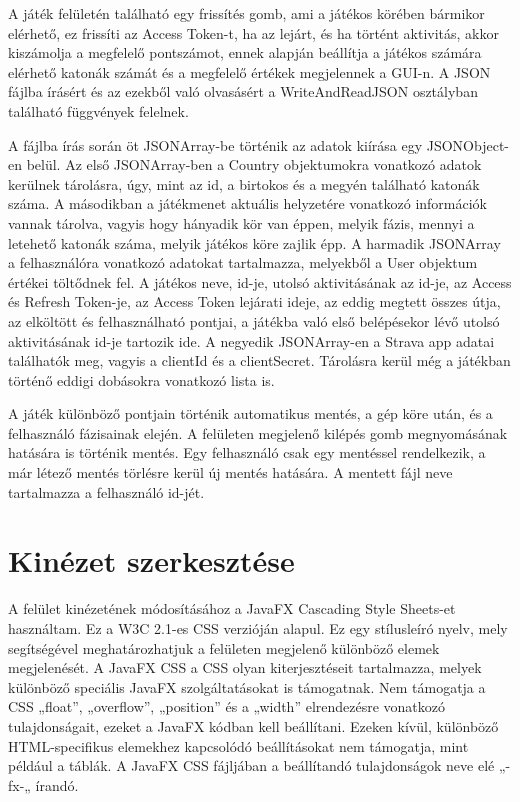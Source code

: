 A játék felületén található egy frissítés gomb, ami a játékos körében bármikor elérhető, ez frissíti az Access Token-t, ha az lejárt, és ha történt aktivitás, akkor kiszámolja a megfelelő pontszámot, ennek alapján beállítja a játékos számára elérhető katonák számát és a megfelelő értékek megjelennek a GUI-n. A JSON fájlba írásért és az ezekből való olvasásért a WriteAndReadJSON osztályban található függvények felelnek. 

A fájlba írás során öt JSONArray-be történik az adatok kiírása egy JSONObject-en belül. Az első JSONArray-ben a Country objektumokra vonatkozó adatok kerülnek tárolásra, úgy, mint az id, a birtokos és a megyén található katonák száma. A másodikban a játékmenet aktuális helyzetére vonatkozó információk vannak tárolva, vagyis hogy hányadik kör van éppen, melyik fázis, mennyi a letehető katonák száma, melyik játékos köre zajlik épp. A harmadik JSONArray a felhasználóra vonatkozó adatokat tartalmazza, melyekből a User objektum értékei töltődnek fel. A játékos neve, id-je, utolsó aktivitásának az id-je, az Access és Refresh Token-je, az Access Token lejárati ideje, az eddig megtett összes útja, az elköltött és felhasználható pontjai, a játékba való első belépésekor lévő utolsó aktivitásának id-je tartozik ide. A negyedik JSONArray-en a Strava app adatai találhatók meg, vagyis a clientId és a clientSecret. Tárolásra kerül még a játékban történő eddigi dobásokra vonatkozó lista is. 

A játék különböző pontjain történik automatikus mentés, a gép köre után, és a felhasználó fázisainak elején. A felületen megjelenő kilépés gomb megnyomásának hatására is történik mentés. Egy felhasználó csak egy mentéssel rendelkezik, a már létező mentés törlésre kerül új mentés hatására. A mentett fájl neve tartalmazza a felhasználó id-jét. 

\section{Kinézet szerkesztése}

A felület kinézetének módosításához a JavaFX Cascading Style Sheets-et használtam. Ez a W3C 2.1-es CSS verzióján alapul. Ez egy stílusleíró nyelv, mely segítségével meghatározhatjuk a felületen megjelenő különböző elemek megjelenését. A JavaFX CSS a CSS olyan kiterjesztéseit tartalmazza, melyek különböző speciális JavaFX szolgáltatásokat is támogatnak. Nem támogatja a CSS „float”, „overflow”, „position” és a „width” elrendezésre vonatkozó tulajdonságait, ezeket a JavaFX kódban kell beállítani. Ezeken kívül, különböző HTML-specifikus elemekhez kapcsolódó beállításokat nem támogatja, mint például a táblák. A JavaFX CSS fájljában a beállítandó tulajdonságok neve elé „-fx-„ írandó. 

